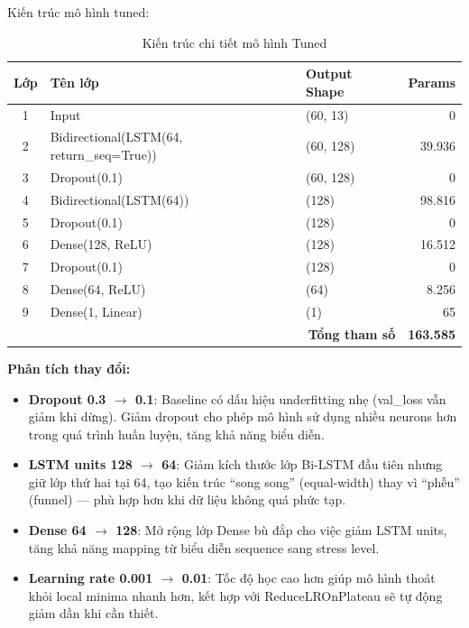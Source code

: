 Kiến trúc mô hình tuned:

\begin{table}[H]
\centering
\caption{Kiến trúc chi tiết mô hình Tuned}
\label{tab:tuned_architecture}
\small
\begin{tabular}{|c|l|l|r|}
\hline
\textbf{Lớp} & \textbf{Tên lớp} & \textbf{Output Shape} & \textbf{Params} \\
\hline
1 & Input                              & (60, 13)        & 0 \\
2 & Bidirectional(LSTM(64, return\_seq=True)) & (60, 128) & 39.936 \\
3 & Dropout(0.1)                       & (60, 128)       & 0 \\
4 & Bidirectional(LSTM(64))            & (128)           & 98.816 \\
5 & Dropout(0.1)                       & (128)           & 0 \\
6 & Dense(128, ReLU)                   & (128)           & 16.512 \\
7 & Dropout(0.1)                       & (128)           & 0 \\
8 & Dense(64, ReLU)                    & (64)            & 8.256 \\
9 & Dense(1, Linear)                   & (1)             & 65 \\
\hline
\multicolumn{3}{|r|}{\textbf{Tổng tham số}} & \textbf{163.585} \\
\hline
\end{tabular}
\end{table}

\textbf{Phân tích thay đổi:}
\begin{itemize}
    \item \textbf{Dropout 0.3 $\to$ 0.1}: Baseline có dấu hiệu underfitting nhẹ (val\_loss vẫn giảm khi dừng). Giảm dropout cho phép mô hình sử dụng nhiều neurons hơn trong quá trình huấn luyện, tăng khả năng biểu diễn.
    \item \textbf{LSTM units 128 $\to$ 64}: Giảm kích thước lớp Bi-LSTM đầu tiên nhưng giữ lớp thứ hai tại 64, tạo kiến trúc ``song song'' (equal-width) thay vì ``phễu'' (funnel) — phù hợp hơn khi dữ liệu không quá phức tạp.
    \item \textbf{Dense 64 $\to$ 128}: Mở rộng lớp Dense bù đắp cho việc giảm LSTM units, tăng khả năng mapping từ biểu diễn sequence sang stress level.
    \item \textbf{Learning rate 0.001 $\to$ 0.01}: Tốc độ học cao hơn giúp mô hình thoát khỏi local minima nhanh hơn, kết hợp với ReduceLROnPlateau sẽ tự động giảm dần khi cần thiết.
\end{itemize}

